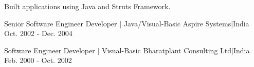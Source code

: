 \begin{cventries}
    {
      \begin{cvitems}
        \item {Built applications using Java and Struts Framework.}
      \end{cvitems}
    }
  \cventry
    {Senior Software Engineer}
    {Developer | Java/Visual-Basic}
    {Aspire Systems|India}
    {Oct. 2002 - Dec. 2004}
    {
      \begin{cvitems}
      \end{cvitems}
    }
  \cventry
    {Software Engineer}
    {Developer | Visual-Basic}
    {Bharatplant Consulting Ltd|India}
    {Feb. 2000 - Oct. 2002}
    {
      \begin{cvitems}
      \end{cvitems}
    }
\end{cventries}
